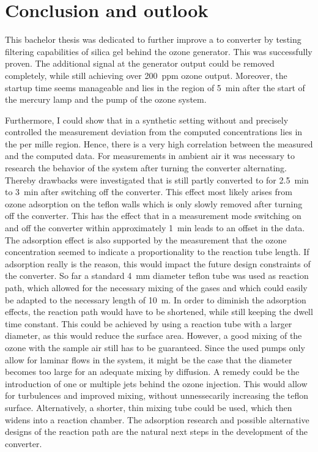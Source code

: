 \section{Conclusion and outlook}
\label{sec:conclusion}

This bachelor thesis was dedicated to further improve a  to
 converter by testing  filtering capabilities of silica gel
behind the ozone generator. This was successfully proven. The
additional  signal at the generator output could be removed
completely, while still achieving over \SI{200}{ppm} ozone
output. Moreover, the startup time seems manageable and lies in the
region of \SI{5}{\minute} after the start of the mercury lamp and the
pump of the ozone system. 

Furthermore, I could show that in a synthetic setting without 
and precisely controlled  the measurement deviation from the
computed  concentrations lies in the per mille region. Hence,
there is a very high correlation between the measured and the computed
data. For measurements in ambient air it was necessary to research the
behavior of the system after turning the converter alternating.
Thereby drawbacks were investigated that  is still partly
converted to  for \SI{2.5}{\minute} to \SI{3}{\minute} after
switching off the converter. This effect most likely arises from ozone
adsorption on the teflon walls which is only slowly removed after
turning off the converter. This has the effect that in a measurement
mode switching on and off the converter within approximately
\SI{1}{\minute} leads to an offset in the  data.  The
adsorption effect is also supported by the measurement that the ozone
concentration seemed to indicate a proportionality to the reaction
tube length. If adsorption really is the reason, this would impact the
future design constraints of the converter. So far a standard
\SI{4}{\milli\meter} diameter teflon tube was used as reaction path,
which allowed for the necessary mixing of the gases and which could
easily be adapted to the necessary length of \SI{10}{\meter}. In order
to diminish the adsorption effects, the reaction path would have to be
shortened, while still keeping the dwell time constant. This could be
achieved by using a reaction tube with a larger diameter, as this
would reduce the surface area. However, a good mixing of the ozone
with the sample air still has to be guaranteed. Since the used pumps
only allow for laminar flows in the system, it might be the case that
the diameter becomes too large for an adequate mixing by diffusion. A
remedy could be the introduction of one or multiple jets behind the
ozone injection. This would allow for turbulences and improved mixing,
without unnessecarily increasing the teflon surface. Alternatively, a
shorter, thin mixing tube could be used, which then widens into a
reaction chamber. The adsorption research and possible alternative
designs of the reaction path are the natural next steps in the
development of the converter.

